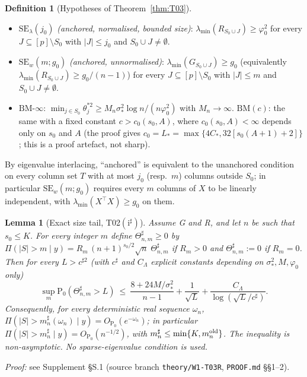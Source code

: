 \documentclass[11pt]{article}
\newtheorem{lemma}{Lemma}
\theoremstyle{definition}
\newtheorem{definition}{Definition}
\theoremstyle{remark}
\renewcommand{\Pr}{\mathrm{P}}
\newcommand{\Sz}{S_0}
\begin{document}
\begin{definition}[Hypotheses of Theorem~\ref{thm:T03}]\label{def:SE}
\begin{itemize}
\item $\mathrm{SE}_\lambda(j_0)$ \emph{(anchored, normalised, bounded size)}: $\lambda_{\min}(R_{\Sz\cup J})\ge\varphi_0^2$ for every
$J\subseteq[p]\setminus\Sz$ with $|J|\le j_0$ and $\Sz\cup J\ne\emptyset$.
\item $\mathrm{SE}_w(m;g_0)$ \emph{(anchored, unnormalised)}: $\lambda_{\min}(G_{\Sz\cup J})\ge g_0$ (equivalently
$\lambda_{\min}(R_{\Sz\cup J})\ge g_0/(n-1)$) for every $J\subseteq[p]\setminus\Sz$ with $|J|\le m$ and $\Sz\cup J\ne\emptyset$.
\item $\mathrm{BM}\text{-}\infty$: $\min_{j\in\Sz}\theta_j^{*2}\ge M_n\sigma_*^2\log n/(n\varphi_0^2)$ with $M_n\to\infty$.
$\mathrm{BM}(c)$: the same with a fixed constant $c>c_0(s_0,A)$, where $c_0(s_0,A)<\infty$ depends only on $s_0$ and
$A$ (the proof gives $c_0=L_*=\max\{4C_*,32[s_0(A+1)+2]\}$; this is a proof artefact, not sharp).
\end{itemize}
By eigenvalue interlacing, ``anchored'' is equivalent to the unanchored condition on every column set $T$ with at
most $j_0$ (resp.\ $m$) columns outside $\Sz$; in particular $\mathrm{SE}_w(m;g_0)$ requires every $m$ columns of $X$
to be linearly independent, with $\lambda_{\min}(X^\top X)\ge g_0$ on them.
\end{definition}

\begin{lemma}[Exact size tail, T02$(\mathrm{i}^\sharp)$]\label{thm:T02}
Assume G and R, and let $n$ be such that $s_0\le K$. For every integer $m$ define $\Theta^\sharp_{n,m}\ge0$ by
$\Pi(|S|>m\mid y)=R_m\,(n+1)^{s_0/2}\sqrt n\;\Theta^\sharp_{n,m}$ if $R_m>0$ and $\Theta^\sharp_{n,m}:=0$ if $R_m=0$.
Then for every $L>c^{\sharp2}$ (with $c^\sharp$ and $C_\Lambda$ explicit constants depending on $\sigma_*^2,M,\varphi_0$ only)
\[
\sup_m\Pr_0(\Theta^\sharp_{n,m}>L)\ \le\ \frac{8+24M/\sigma_*^2}{n-1}+\frac1{\sqrt L}+\frac{C_\Lambda}{\log(\sqrt L/c^\sharp)} .
\]
Consequently, for every deterministic real sequence $\omega_n$, $\Pi(|S|>m^\sharp_n(\omega_n)\mid y)=O_{\Pr_0}(e^{-\omega_n})$; in
particular $\Pi(|S|>m^\sharp_n\mid y)=O_{\Pr_0}(n^{-1/2})$, with $m^\sharp_n\le\min\{K,m_n^{\rm old}\}$. The inequality is
non-asymptotic. No sparse-eigenvalue condition is used.
\end{lemma}
\noindent\emph{Proof:} see Supplement \S S.1 (source branch \texttt{theory/W1-T03R}, \texttt{PROOF.md} \S\S1--2).
\end{document}
